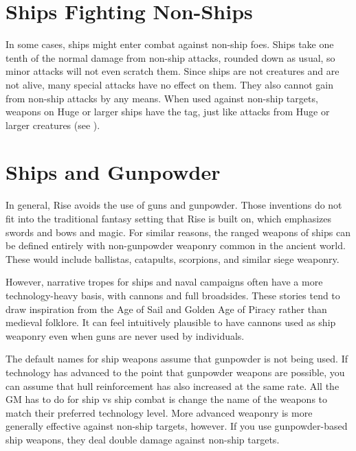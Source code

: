 \section{Ships Fighting Non-Ships}
    In some cases, ships might enter combat against non-ship foes.
    Ships take one tenth of the normal damage from non-ship attacks, rounded down as usual, so minor attacks will not even scratch them.
    Since ships are not creatures and are not alive, many special attacks have no effect on them.
    They also cannot gain  from non-ship attacks by any means.
    When used against non-ship targets, weapons on Huge or larger ships have the  tag, just like attacks from Huge or larger creatures (see ).

\section{Ships and Gunpowder}
    In general, Rise avoids the use of guns and gunpowder.
    Those inventions do not fit into the traditional fantasy setting that Rise is built on, which emphasizes swords and bows and magic.
    For similar reasons, the ranged weapons of ships can be defined entirely with non-gunpowder weaponry common in the ancient world.
    These would include ballistas, catapults, scorpions, and similar siege weaponry.

    However, narrative tropes for ships and naval campaigns often have a more technology-heavy basis, with cannons and full broadsides.
    These stories tend to draw inspiration from the Age of Sail and Golden Age of Piracy rather than medieval folklore.
    It can feel intuitively plausible to have cannons used as ship weaponry even when guns are never used by individuals.

    The default names for ship weapons assume that gunpowder is not being used.
    If technology has advanced to the point that gunpowder weapons are possible, you can assume that hull reinforcement has also increased at the same rate.
    All the GM has to do for ship vs ship combat is change the name of the weapons to match their preferred technology level.
    More advanced weaponry is more generally effective against non-ship targets, however.
    If you use gunpowder-based ship weapons, they deal double damage against non-ship targets.

